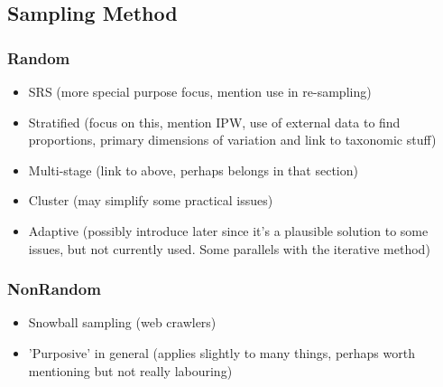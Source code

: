 
\subsection{Sampling Method}





\subsubsection{Random}


\begin{itemize}
    \item SRS (more special purpose focus, mention use in re-sampling)
    \item Stratified (focus on this, mention IPW, use of external data to find proportions, primary dimensions of variation and link to taxonomic stuff)
    \item Multi-stage (link to above, perhaps belongs in that section)
    \item Cluster (may simplify some practical issues)
    \item Adaptive (possibly introduce later since it's a plausible solution to some issues, but not currently used.  Some parallels with the iterative method)
\end{itemize}

\subsubsection{NonRandom}

\begin{itemize}
    \item Snowball sampling (web crawlers)
    \item 'Purposive' in general (applies slightly to many things, perhaps worth mentioning but not really labouring)
\end{itemize}












